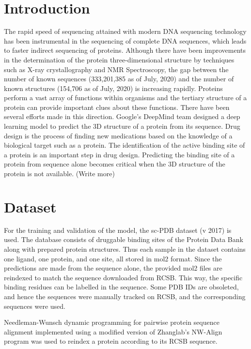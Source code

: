 \documentclass[journal=jacsat,manuscript=article]{achemso}
\begin{document}
\section{Introduction}
\quad The rapid speed of sequencing attained with modern DNA sequencing technology has been instrumental in the sequencing of complete DNA sequences, which leads to faster indirect sequencing of proteins. Although there have been improvements in the determination of the protein three-dimensional structure by techniques such as X-ray crystallography and NMR Spectroscopy, the gap between the number of known sequences (333,201,385 as of July, 2020) and the number of known structures (154,706 as of July, 2020) is increasing rapidly. Proteins perform a vast array of functions within organisms and the tertiary structure of a protein can provide important clues about these functions. There have been several efforts made in this direction. Google's DeepMind team designed a deep learning model to predict the 3D structure of a protein from its sequence. Drug design is the process of finding new medications based on the knowledge of a biological target such as a protein. The identification of the active binding site of a protein is an important step in drug design. Predicting the binding site of a protein from sequence alone becomes critical when the 3D structure of the protein is not available. (Write more)

\section{Dataset}
\quad For the training and validation of the model, the sc-PDB\cite{desaphy2015sc} dataset (v 2017) is used. The database consists of druggable binding sites of the Protein Data Bank along with prepared protein structures. Thus each sample in the dataset contains one ligand, one protein, and one site, all stored in mol2 format. Since the predictions are made from the sequence alone, the provided mol2 files are reindexed to match the sequence downloaded from RCSB. This way, the specific binding residues can be labelled in the sequence. Some PDB IDs are obsoleted, and hence the sequences were manually tracked on RCSB, and the corresponding sequences were used.

Needleman-Wunsch dynamic programming for pairwise protein sequence alignment implemented using a modified version of Zhanglab's NW-Align program\cite{NWAlign} was used to reindex a protein according to its RCSB sequence.
\end{document}
